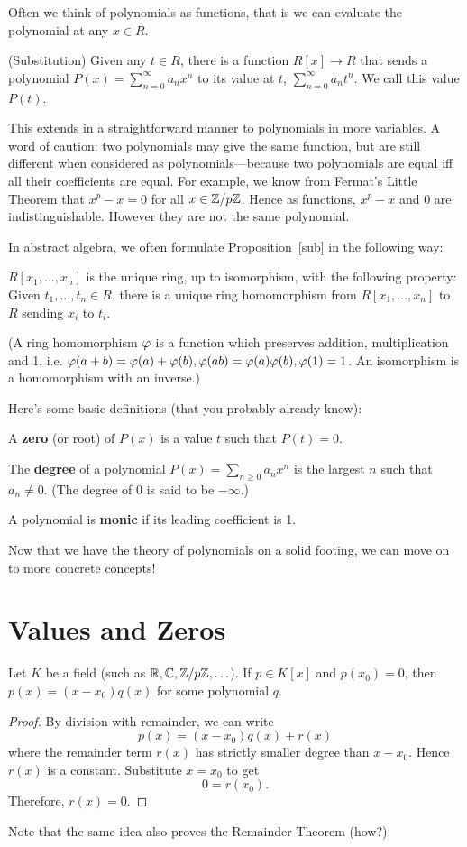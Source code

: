 Often we think of polynomials as functions, that is we can evaluate the polynomial at any $x\in R$.
\begin{pr}\label{sub} (Substitution) Given any $t\in R$, there is a function $R[x]\to R$ that sends a polynomial $P(x)=\sum_{n=0}^{\infty} a_nx^n$ to its value at $t$, $\sum_{n=0}^{\infty} a_nt^n$. We call this value $P(t)$.
\end{pr}
This extends in a straightforward manner to polynomials in more variables. 
A word of caution: two polynomials may give the same function, but are still different when considered as polynomials---because two polynomials are equal iff all their coefficients are equal. For example, we know from Fermat's Little Theorem that $x^p-x=0$ for all $x\in \mathbb{Z}/p\mathbb{Z}$. Hence as functions, $x^p-x$ and $0$ are indistinguishable. However they are not the same polynomial.

In abstract algebra, we often formulate Proposition~\ref{sub} in the following way:
\begin{pr}
$R[x_1,\ldots, x_n]$ is the unique ring, up to isomorphism, with the following property: Given $t_1,\ldots, t_n\in R$, there is a unique ring homomorphism from $R[x_1,\ldots, x_n]$ to $R$ sending $x_i$ to $t_i$.

(A ring homomorphism $\varphi$ is a function which preserves addition, multiplication and 1, i.e. $\varphi(a+b)=\varphi(a)+\varphi(b), \varphi(ab)=\varphi(a)\varphi(b), \varphi(1)=1$. An isomorphism is a homomorphism with an inverse.)
\end{pr}

Here's some basic definitions (that you probably already know):
\begin{df}
A \textbf{zero} (or root) of $P(x)$ is a value $t$ such that $P(t)=0$.

The \textbf{degree} of a polynomial $P(x)=\sum_{n\geq 0} a_n x^n$ is the largest $n$ such that $a_n\neq 0$. (The degree of $0$ is said to be $-\infty$.)

A polynomial is \textbf{monic} if its leading coefficient is 1.
\end{df}

Now that we have the theory of polynomials on a solid footing, we can move on to more concrete concepts!

\section{Values and Zeros}
\begin{pr}\label{factorroot}
Let $K$ be a field (such as $\mathbb{R}, \mathbb{C}, \mathbb{Z}/p\mathbb{Z}, \ldots$).
If $p\in K[x]$ and $p(x_0)=0$, then $p(x)=(x-x_0)q(x)$ for some polynomial $q$.
\end{pr}
\begin{proof}
By division with remainder, we can write
\[p(x)=(x-x_0)q(x)+r(x)\]
where the remainder term $r(x)$ has strictly smaller degree than $x-x_0$. Hence $r(x)$ is a constant. Substitute $x=x_0$ to get
\[0=r(x_0).\]
Therefore, $r(x)=0$.
\end{proof}
Note that the same idea also proves the Remainder Theorem (how?).

